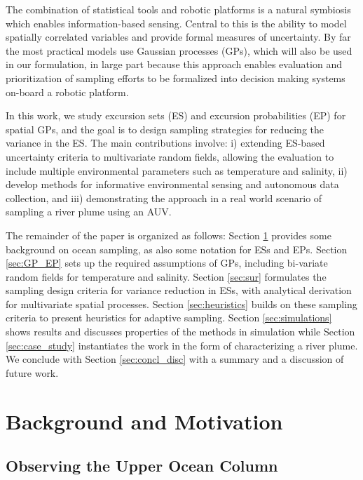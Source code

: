 \documentclass[aoas]{imsart}
\begin{document}
The combination of statistical tools and robotic platforms is a natural
symbiosis which enables information-based sensing. Central to this is
the ability to model spatially correlated variables and provide formal
measures of uncertainty. By far the most practical models use Gaussian
processes (GPs), which will also be used in our formulation, in large
part because this approach enables evaluation and prioritization of
sampling efforts to be formalized into decision making systems on-board
a robotic platform.

In this work, we study excursion sets (ES) and excursion probabilities
(EP) for spatial GPs, and the goal is to design sampling strategies for
reducing the variance in the ES. The main contributions involve: i)
extending ES-based uncertainty criteria to multivariate random fields,
allowing the evaluation to include multiple environmental parameters
such as temperature and salinity, ii) develop methods for informative
environmental sensing and autonomous data collection, and iii)
demonstrating the approach in a real world scenario of sampling a river
plume using an AUV.

The remainder of the paper is organized as follows: Section \ref{sec:bg}
provides some background on ocean sampling, as also some notation for
ESs and EPs. Section \ref{sec:GP_EP} sets up the required assumptions of
GPs, including bi-variate random fields for temperature and salinity.
Section \ref{sec:sur} formulates the sampling design criteria for
variance reduction in ESs, with analytical derivation for multivariate
spatial processes. Section \ref{sec:heuristics} builds on these sampling
criteria to present heuristics for adaptive sampling. Section
\ref{sec:simulations} shows results and discusses properties of the
methods in simulation while Section \ref{sec:case_study} instantiates
the work in the form of characterizing a river plume. We conclude with
Section \ref{sec:concl_disc} with a summary and a discussion of future
work.


\section{Background and Motivation}\label{sec:bg}


\subsection{Observing the Upper Ocean Column}
\end{document}
